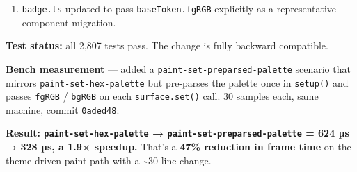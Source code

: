 \begin{enumerate}
\item
  \texttt{b\allowbreak{}a\allowbreak{}d\allowbreak{}g\allowbreak{}e\allowbreak{}.\allowbreak{}t\allowbreak{}s} updated to pass \texttt{b\allowbreak{}a\allowbreak{}s\allowbreak{}e\allowbreak{}T\allowbreak{}o\allowbreak{}k\allowbreak{}e\allowbreak{}n\allowbreak{}.\allowbreak{}f\allowbreak{}g\allowbreak{}R\allowbreak{}G\allowbreak{}B} explicitly as a representative component migration.
\end{enumerate}

\textbf{Test status:} all 2,807 tests pass. The change is fully backward compatible.

\textbf{Bench measurement} --- added a \texttt{p\allowbreak{}a\allowbreak{}i\allowbreak{}n\allowbreak{}t\allowbreak{}-\allowbreak{}s\allowbreak{}e\allowbreak{}t\allowbreak{}-\allowbreak{}p\allowbreak{}r\allowbreak{}e\allowbreak{}p\allowbreak{}a\allowbreak{}r\allowbreak{}s\allowbreak{}e\allowbreak{}d\allowbreak{}-\allowbreak{}p\allowbreak{}a\allowbreak{}l\allowbreak{}e\allowbreak{}t\allowbreak{}t\allowbreak{}e} scenario that mirrors \texttt{p\allowbreak{}a\allowbreak{}i\allowbreak{}n\allowbreak{}t\allowbreak{}-\allowbreak{}s\allowbreak{}e\allowbreak{}t\allowbreak{}-\allowbreak{}h\allowbreak{}e\allowbreak{}x\allowbreak{}-\allowbreak{}p\allowbreak{}a\allowbreak{}l\allowbreak{}e\allowbreak{}t\allowbreak{}t\allowbreak{}e} but pre-parses the palette once in \texttt{s\allowbreak{}e\allowbreak{}t\allowbreak{}u\allowbreak{}p\allowbreak{}(\allowbreak{})} and passes \texttt{f\allowbreak{}g\allowbreak{}R\allowbreak{}G\allowbreak{}B} / \texttt{b\allowbreak{}g\allowbreak{}R\allowbreak{}G\allowbreak{}B} on each \texttt{s\allowbreak{}u\allowbreak{}r\allowbreak{}f\allowbreak{}a\allowbreak{}c\allowbreak{}e\allowbreak{}.\allowbreak{}s\allowbreak{}e\allowbreak{}t\allowbreak{}(\allowbreak{})} call. 30 samples each, same machine, commit \texttt{0\allowbreak{}a\allowbreak{}d\allowbreak{}e\allowbreak{}d\allowbreak{}4\allowbreak{}8}:



\textbf{Result: \texttt{p\allowbreak{}a\allowbreak{}i\allowbreak{}n\allowbreak{}t\allowbreak{}-\allowbreak{}s\allowbreak{}e\allowbreak{}t\allowbreak{}-\allowbreak{}h\allowbreak{}e\allowbreak{}x\allowbreak{}-\allowbreak{}p\allowbreak{}a\allowbreak{}l\allowbreak{}e\allowbreak{}t\allowbreak{}t\allowbreak{}e} → \texttt{p\allowbreak{}a\allowbreak{}i\allowbreak{}n\allowbreak{}t\allowbreak{}-\allowbreak{}s\allowbreak{}e\allowbreak{}t\allowbreak{}-\allowbreak{}p\allowbreak{}r\allowbreak{}e\allowbreak{}p\allowbreak{}a\allowbreak{}r\allowbreak{}s\allowbreak{}e\allowbreak{}d\allowbreak{}-\allowbreak{}p\allowbreak{}a\allowbreak{}l\allowbreak{}e\allowbreak{}t\allowbreak{}t\allowbreak{}e} = 624 µs → 328 µs, a 1.9× speedup.} That's a \textbf{47\% reduction in frame time} on the theme-driven paint path with a \textasciitilde30-line change.

